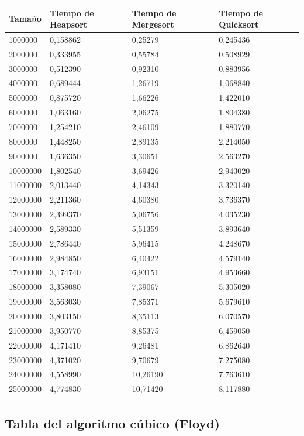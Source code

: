 \documentclass[a4paper, 11pt]{article}
\begin{document}
\begin{tabular}{|l|l|l|l|}
	\hline
	Tamaño & Tiempo de Heapsort & Tiempo de Mergesort & Tiempo de Quicksort \\
	\hline
	\hline
	1000000	&0,158862&	0,25279&	0,245436\\
	\hline
	2000000	&0,333955&	0,55784	&0,508929\\
	\hline
	3000000	&0,512390&	0,92310	&0,883956\\
	\hline
	4000000	&0,689444&	1,26719	&1,068840\\
	\hline
	5000000	&0,875720&	1,66226	&1,422010\\
	\hline
	6000000	&1,063160&	2,06275	&1,804380\\
	\hline
	7000000	&1,254210&	2,46109	&1,880770\\
	\hline
	8000000	&1,448250&	2,89135	&2,214050\\
	\hline
	9000000	&1,636350&	3,30651	&2,563270\\
	\hline
	10000000	&1,802540&	3,69426	&2,943020\\
	\hline
	11000000	&2,013440&	4,14343	&3,320140\\
	\hline
	12000000	&2,211360&	4,60380	&3,736370\\
	\hline
	13000000	&2,399370&	5,06756	&4,035230\\
	\hline
	14000000	&2,589330&	5,51359	&3,893640\\
	\hline
	15000000	&2,786440&	5,96415	&4,248670\\
	\hline
	16000000	&2,984850&	6,40422	&4,579140\\
	\hline
	17000000	&3,174740&	6,93151	&4,953660\\
	\hline
	18000000	&3,358080&	7,39067	&5,305020\\
	\hline
	19000000	&3,563030&	7,85371	&5,679610\\
	\hline
	20000000	&3,803150&	8,35113	&6,070570\\
	\hline
	21000000	&3,950770&	8,85375	&6,459050\\
	\hline
	22000000	&4,171410&	9,26481	&6,862640\\
	\hline
	23000000	&4,371020&	9,70679	&7,275080\\
	\hline
	24000000	&4,558990&	10,26190	&7,763610\\
	\hline
	25000000	&4,774830&	10,71420	&8,117880\\
	\hline
\end{tabular}

\subsection{Tabla del algoritmo cúbico (Floyd)}
\end{document}
